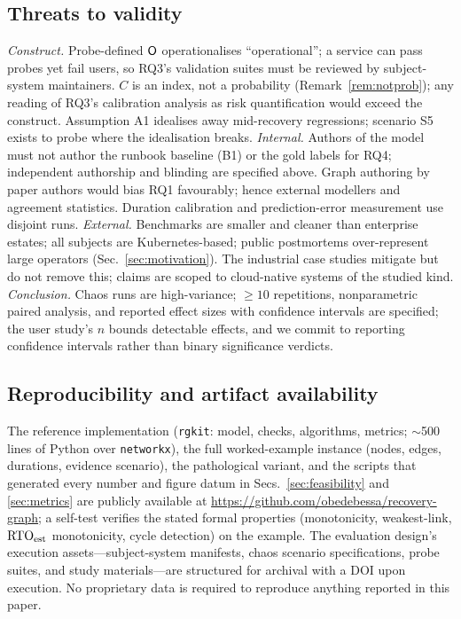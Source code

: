 \subsection{Threats to validity}
\label{sec:threats}

\emph{Construct.} Probe-defined $\mathsf{O}$ operationalises ``operational''; a service can pass probes yet fail users, so RQ3's validation suites must be reviewed by subject-system maintainers. $C$ is an index, not a probability (Remark~\ref{rem:notprob}); any reading of RQ3's calibration analysis as risk quantification would exceed the construct. Assumption A1 idealises away mid-recovery regressions; scenario S5 exists to probe where the idealisation breaks. \emph{Internal.} Authors of the model must not author the runbook baseline (B1) or the gold labels for RQ4; independent authorship and blinding are specified above. Graph authoring by paper authors would bias RQ1 favourably; hence external modellers and agreement statistics. Duration calibration and prediction-error measurement use disjoint runs. \emph{External.} Benchmarks are smaller and cleaner than enterprise estates; all subjects are Kubernetes-based; public postmortems over-represent large operators (Sec.~\ref{sec:motivation}). The industrial case studies mitigate but do not remove this; claims are scoped to cloud-native systems of the studied kind. \emph{Conclusion.} Chaos runs are high-variance; $\geq 10$ repetitions, nonparametric paired analysis, and reported effect sizes with confidence intervals are specified; the user study's $n$ bounds detectable effects, and we commit to reporting confidence intervals rather than binary significance verdicts.

\subsection{Reproducibility and artifact availability}
\label{sec:repro}
The reference implementation (\texttt{rgkit}: model, checks, algorithms, metrics; $\sim$500 lines of Python over \texttt{networkx}), the full worked-example instance (nodes, edges, durations, evidence scenario), the pathological variant, and the scripts that generated every number and figure datum in Secs.~\ref{sec:feasibility} and \ref{sec:metrics} are publicly available at \url{https://github.com/obedebessa/recovery-graph}; a self-test verifies the stated formal properties (monotonicity, weakest-link, $\mathrm{RTO}_{\mathrm{est}}$ monotonicity, cycle detection) on the example. The evaluation design's execution assets---subject-system manifests, chaos scenario specifications, probe suites, and study materials---are structured for archival with a DOI upon execution. No proprietary data is required to reproduce anything reported in this paper.

